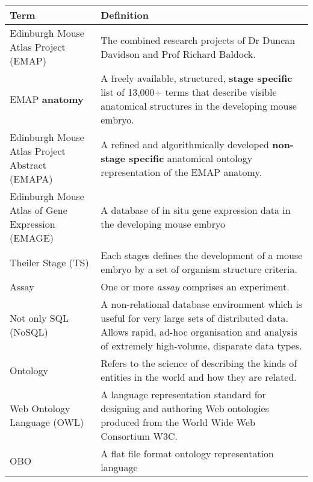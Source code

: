 \begin{center}
    \begin{tabular}{ |p{0.3\linewidth} | p{0.7\linewidth} |}
    \hline
    \textbf{Term} & \textbf{Definition} \\ \hline
    Edinburgh Mouse Atlas Project (EMAP) & The combined research projects of Dr Duncan Davidson and Prof Richard Baldock. \\ \hline
    EMAP \textbf{anatomy} & A freely available, structured, \textbf{stage specific} list of 13,000+ terms that describe visible anatomical structures in the developing mouse embryo. \\ \hline
    Edinburgh Mouse Atlas Project Abstract (EMAPA) & A refined and algorithmically developed \textbf{non-stage specific} anatomical ontology representation of the EMAP anatomy. \\ \hline
    Edinburgh Mouse Atlas of Gene Expression (EMAGE) & A database of in situ gene expression data in the developing mouse embryo  \\ \hline
    Theiler Stage (TS) & Each stages defines the development of a mouse embryo by a set of organism structure criteria. \\ \hline
    Assay & One or more \textit{assay} comprises an experiment. \\ \hline
    Not only SQL (NoSQL) & A non-relational database environment which is useful for very large sets of distributed data. Allows rapid, ad-hoc organisation and analysis of extremely high-volume, disparate data types. \\ \hline
        Ontology & Refers to the science of describing the kinds of entities in the world and how they are related. \\ \hline
            Web Ontology Language (OWL) & A language representation standard for designing and authoring Web ontologies produced from the World Wide Web Consortium W3C. \\ \hline
          OBO & A flat file format ontology representation language \\ \hline
    \end{tabular}
\end{center}
